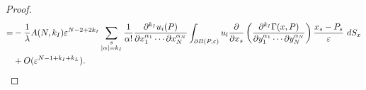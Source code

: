 \documentclass[11pt,reqno]{article}
\numberwithin{equation}{section}
\newcommand\e\varepsilon
\newcommand\la\lambda
\newcommand{\Ma}{\color{blue}}
\newcommand{\Ying}{\color{red}}
\begin{document}
\begin{proof}
\begin{equation}
\begin{aligned}
                    =&-\frac{1}{\la}A(N,{ k_I})\e^{N-2+2{ k_I}}	\sum_{\substack{s\\|\alpha|={ k_I}}}\frac1{\alpha!}
					\frac{\partial^{{ k_I}}u_i(P)}{\partial x_1^{\alpha_1}\cdots\partial x_N^{\alpha_N}}\int_{\partial B(P,\e)} u_l\frac{\partial}{\partial x_s}\left(\frac{\partial^{{ k_I}}\Gamma(x,P)}{\partial y_1^{\alpha_1}\cdots\partial y_N^{\alpha_N}}\right)\frac{x_s-P_s}{\e}\ dS_x\vspace{2mm}\\
                    &+O(\e^{N-1+{ k_I}+{ k_L}}).\vspace{2mm}\\

\end{aligned}
\end{equation}
\end{proof}
\end{document}
